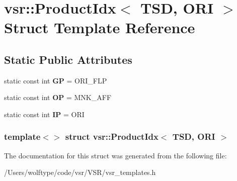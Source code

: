 \hypertarget{structvsr_1_1_product_idx_3_01_t_s_d_00_01_o_r_i_01_4}{\section{vsr\-:\-:Product\-Idx$<$ T\-S\-D, O\-R\-I $>$ Struct Template Reference}
\label{structvsr_1_1_product_idx_3_01_t_s_d_00_01_o_r_i_01_4}
}
\subsection*{Static Public Attributes}
\begin{DoxyCompactItemize}
\item 
\hypertarget{structvsr_1_1_product_idx_3_01_t_s_d_00_01_o_r_i_01_4_abd9252928b04d5a0c0160dde447e62ee}{static const int {\bfseries G\-P} = O\-R\-I\-\_\-\-F\-L\-P}\label{structvsr_1_1_product_idx_3_01_t_s_d_00_01_o_r_i_01_4_abd9252928b04d5a0c0160dde447e62ee}

\item 
\hypertarget{structvsr_1_1_product_idx_3_01_t_s_d_00_01_o_r_i_01_4_a04a220f9cb19fe6d46885079c96997da}{static const int {\bfseries O\-P} = M\-N\-K\-\_\-\-A\-F\-F}\label{structvsr_1_1_product_idx_3_01_t_s_d_00_01_o_r_i_01_4_a04a220f9cb19fe6d46885079c96997da}

\item 
\hypertarget{structvsr_1_1_product_idx_3_01_t_s_d_00_01_o_r_i_01_4_a944b398a94af5cbe43699ffec1fee0b8}{static const int {\bfseries I\-P} = O\-R\-I}\label{structvsr_1_1_product_idx_3_01_t_s_d_00_01_o_r_i_01_4_a944b398a94af5cbe43699ffec1fee0b8}

\end{DoxyCompactItemize}
\subsubsection*{template$<$$>$ struct vsr\-::\-Product\-Idx$<$ T\-S\-D, O\-R\-I $>$}



The documentation for this struct was generated from the following file\-:\begin{DoxyCompactItemize}
\item 
/\-Users/wolftype/code/vsr/\-V\-S\-R/vsr\-\_\-templates.\-h\end{DoxyCompactItemize}

